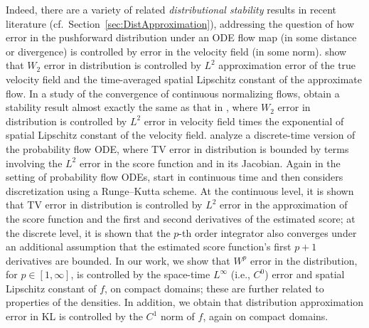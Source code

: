 
        
        

Indeed, there are a variety of  related \textit{distributional stability} results in recent literature (cf.\ Section~\ref{sec:DistApproximation}), addressing the question of how error in the pushforward distribution under an ODE flow map (in some distance or divergence) is controlled by error in the velocity field (in some norm). \citet{BentonErrorBoundsFlowMatching} show that $W_2$ error in distribution is controlled by $L^2$ approximation error of the true velocity field and the time-averaged spatial Lipschitz constant of the approximate flow. In a study of the convergence of continuous normalizing flows, \citet{GaoConvergenceofContinusNormalizingFlows} obtain a stability result almost exactly the same as that in \citet{BentonErrorBoundsFlowMatching}, where $W_2$ error in distribution is controlled by $L^2$ error in velocity field times the exponential of spatial Lipschitz constant of the velocity field.
    \citet{LiProbabilisticODEConvergence} analyze a discrete-time version of the probability flow ODE, where TV error in distribution is bounded by terms involving the $L^2$ error in the score function and in its Jacobian. Again in the setting of probability flow ODEs, \citet{HuangProbabilisticODEConvergence} start in continuous time and then considers discretization using a Runge--Kutta scheme. At the continuous level, it is shown that TV error in distribution is controlled by 
    $L^2$ error in the approximation of the score function and
    the first and second
derivatives of the estimated score; at the discrete level, it is shown that the $p$-th order integrator also converges under an additional assumption that the estimated score function’s first $p + 1$ derivatives are bounded. In our work, we show that $W^p$ error in the distribution, for $p \in [1, \infty]$, is controlled by the space-time $L^\infty$ (i.e., $C^0$) error and spatial Lipschitz constant of $f$, on compact domains; these are further related to properties of the densities. In addition, we obtain that distribution approximation error in KL is controlled by the $C^1$ norm of $f$, again on compact domains.
    
